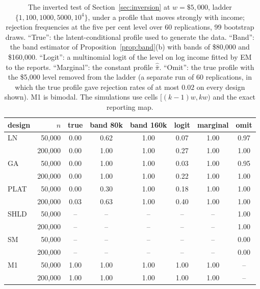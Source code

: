 \begin{table}[h]
\centering\footnotesize
\caption{The inverted test of Section~\ref{sec:inversion} at $w=\$5{,}000$, ladder $\{1,100,1000,5000,10^4\}$, under a profile that moves strongly with income; rejection frequencies at the five per cent level over 60 replications, 99 bootstrap draws. ``True'': the latent-conditional profile used to generate the data. ``Band'': the band estimator of Proposition~\ref{prop:band}(b) with bands of \$80{,}000 and \$160{,}000. ``Logit'': a multinomial logit of the level on log income fitted by EM to the reports. ``Marginal'': the constant profile $\hat{\bar\pi}$. ``Omit'': the true profile with the \$5{,}000 level removed from the ladder (a separate run of 60 replications, in which the true profile gave rejection rates of at most $0.02$ on every design shown). M1 is bimodal. The simulations use cells $[(k-1)w,kw)$ and the exact reporting map.}\label{tab:S-inv}
\begin{tabular}{lrcccccc}
\toprule
design & $n$ & true & band 80k & band 160k & logit & marginal & omit\\
\midrule
LN & 50{,}000 & 0.00 & 0.62 & 1.00 & 0.07 & 1.00 & 0.97\\
 & 200{,}000 & 0.00 & 1.00 & 1.00 & 0.27 & 1.00 & 1.00\\
GA & 50{,}000 & 0.00 & 1.00 & 1.00 & 0.03 & 1.00 & 0.95\\
 & 200{,}000 & 0.00 & 1.00 & 1.00 & 0.22 & 1.00 & 1.00\\
PLAT & 50{,}000 & 0.00 & 0.30 & 1.00 & 0.18 & 1.00 & 1.00\\
 & 200{,}000 & 0.03 & 0.63 & 1.00 & 0.40 & 1.00 & 1.00\\
SHLD & 50{,}000 & -- & -- & -- & -- & -- & 1.00\\
 & 200{,}000 & -- & -- & -- & -- & -- & 1.00\\
SM & 50{,}000 & -- & -- & -- & -- & -- & 0.00\\
 & 200{,}000 & -- & -- & -- & -- & -- & 0.00\\
M1 & 50{,}000 & 1.00 & 1.00 & 1.00 & 1.00 & 1.00 & --\\
 & 200{,}000 & 1.00 & 1.00 & 1.00 & 1.00 & 1.00 & --\\
\bottomrule
\end{tabular}
\end{table}
